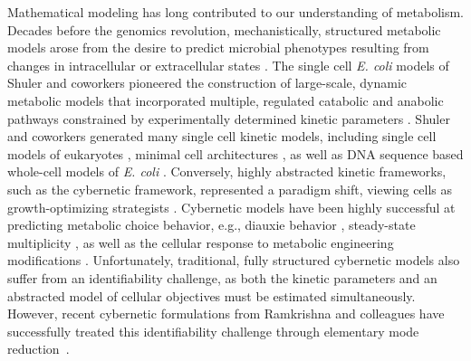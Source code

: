 \documentclass[12pt]{article}
\begin{document}
Mathematical modeling has long contributed to our understanding of metabolism.
Decades before the genomics revolution, mechanistically, structured metabolic models arose from the desire to predict microbial phenotypes resulting from changes in intracellular or extracellular states \citep{1976_fredrickson_BiotechBioeng}.
The single cell \textit{E. coli} models of Shuler and coworkers pioneered the construction of large-scale, dynamic metabolic models that incorporated multiple, regulated catabolic and anabolic pathways constrained by experimentally determined kinetic parameters \citep{1984_domach_shuler_BiotechBioeng_01}.
Shuler and coworkers generated many single cell kinetic models, including single cell models of eukaryotes \citep{1989_steinmeyer_shuler_ChemEngSci,1992_wu_shuler_AnnNYAcadSci}, minimal cell architectures \citep{2004_castellanos_shuler_PNAS}, as well as DNA sequence based whole-cell models of \textit{E. coli} \citep{2008_atlas_shuler_IETSysBio}.
Conversely, highly abstracted kinetic frameworks, such as the cybernetic framework, represented a paradigm shift, viewing cells as growth-optimizing strategists \citep{1985_dhurjati_ramkrishna_tsao_BiotechBioeng}.
Cybernetic models have been highly successful at predicting metabolic choice behavior, e.g., diauxie behavior \citep{1986_kompala_ramkrishna_tsao_BiotechBioeng}, steady-state multiplicity \citep{2012_kim_ramkrishna_BiotechProg}, as well as the cellular response to metabolic engineering modifications \citep{1999_varner_ramkrishna_MetaEng}.
Unfortunately, traditional, fully structured cybernetic models also suffer from an identifiability challenge, as both the kinetic parameters and an abstracted model of cellular objectives must be estimated simultaneously.
However, recent cybernetic formulations from Ramkrishna and colleagues have successfully treated this identifiability challenge through elementary mode reduction~\cite{2009_song_ramkrishna_BiotechBioeng,Song:2011aa}.
\end{document}
